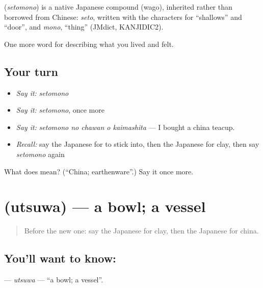 \begin{cousinweb}
\textbf{} (\emph{setomono}) is a native Japanese compound (wago), inherited rather than borrowed from Chinese: \emph{seto}, written with the characters for \textquotedblleft{}shallows\textquotedblright{} and \textquotedblleft{}door\textquotedblright{}, and \emph{mono}, \textquotedblleft{}thing\textquotedblright{} (JMdict, KANJIDIC2).
\end{cousinweb}

\begin{grammarlens}[title={What you've built}]
One more word for describing what you lived and felt.
\end{grammarlens}

\subsection*{Your turn}
\begin{itemize}
\raggedright
  \item \emph{Say it:} \emph{setomono}
  \item \emph{Say it:} \emph{setomono}, once more
  \item \emph{Say it:} \emph{setomono no chawan o kaimashita} — I bought a china teacup.
  \item \emph{Recall:} say the Japanese for to stick into, then the Japanese for clay, then say \emph{setomono} again
\end{itemize}

\begin{tcolorbox}[breakable,colback=teal!4,colframe=teal!35!black,title={Before you move on}]
What does  mean? (\textquotedblleft{}China; earthenware\textquotedblright{}.) Say it once more.
\end{tcolorbox}
\section[\texorpdfstring{\ja{うつわ} (utsuwa)}{うつわ (utsuwa)}]{ (utsuwa) — a bowl; a vessel}

\label{lesson:JA-C483-utsuwa}



\begin{quote}
Before the new one: say the Japanese for clay, then the Japanese for china.
\end{quote}

\subsection*{You'll want to know: }
\textbf{} — \emph{utsuwa} — \textquotedblleft{}a bowl; a vessel\textquotedblright{}.

